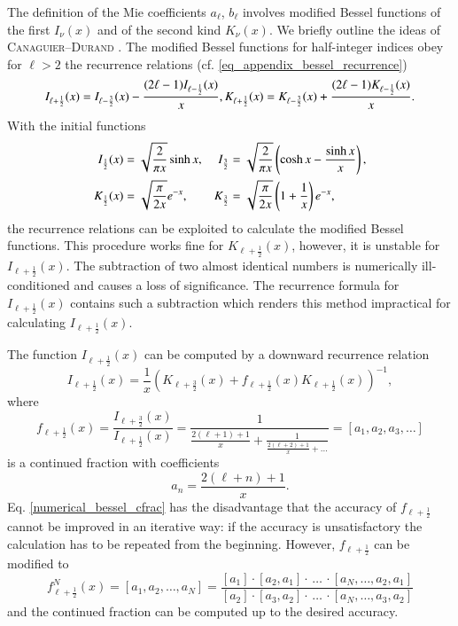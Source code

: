 The definition of the Mie coefficients $a_\ell$, $b_\ell$ involves modified
Bessel functions of the first $I_\nu(x)$ and of the second kind $K_\nu(x)$.  We
briefly outline the ideas of \textsc{Canaguier--Durand} \cite{Durand}.  The
modified Bessel functions for half-integer indices obey for $\ell > 2$ the
recurrence relations (cf. \eqref{eq_appendix_bessel_recurrence})
\begin{equation}
\label{numerics_bessel_recurrence}
I_{\ell+\frac{1}{2}}(x) = I_{\ell-\frac{3}{2}}(x) - \frac{(2\ell-1)I_{\ell-\frac{1}{2}}(x)}{x}, \\
K_{\ell+\frac{1}{2}}(x) = K_{\ell-\frac{3}{2}}(x) + \frac{(2\ell-1)K_{\ell-\frac{1}{2}}(x)}{x}.
\end{equation}
With the initial functions
\begin{align}
\label{numerics_bessel_start}
I_{\frac{1}{2}}(x) &= \sqrt{\frac{2}{\pi x}} \sinh x,   & I_{\frac{3}{2}} &= \sqrt{\frac{2}{\pi x}}\left(\cosh x - \frac{\sinh x}{x}\right), \\
K_{\frac{1}{2}}(x) &= \sqrt{\frac{\pi}{2 x}} e^{-x},   & K_{\frac{3}{2}} &= \sqrt{\frac{\pi}{2x}} \left(1 + \frac{1}{x}\right) e^{-x},
\end{align}
the recurrence relations can be exploited to calculate the modified Bessel
functions. This procedure works fine for $K_{\ell+\frac{1}{2}}(x)$, however, it
is unstable for $I_{\ell+\frac{1}{2}}(x)$. The subtraction of two almost
identical numbers is numerically ill-conditioned and causes a loss of
significance. The recurrence formula for $I_{\ell+\frac{1}{2}}(x)$ contains
such a subtraction which renders this method impractical for calculating
$I_{\ell+\frac{1}{2}}(x)$.

The function $I_{\ell+\frac{1}{2}}(x)$ can be computed by a downward recurrence
relation
\begin{equation}
\label{numerical_bessel_cfrac}
I_{\ell+\frac{1}{2}}(x) = \frac{1}{x} \left(K_{\ell+\frac{3}{2}}(x) + f_{\ell+\frac{1}{2}}(x) K_{\ell+\frac{1}{2}}(x)\right)^{-1},
\end{equation}
where
\begin{equation}
f_{\ell+\frac{1}{2}}(x) = \frac{I_{\ell+\frac{3}{2}}(x)}{I_{\ell+\frac{1}{2}}(x)} = \frac{1}{\frac{2(\ell+1)+1}{x} + \frac{1}{\frac{2(\ell+2)+1}{x} + \dots}} = [a_1, a_2, a_3, \dots]
\end{equation}
is a continued fraction with coefficients
\begin{equation}
a_n = \frac{2(\ell+n)+1}{x}.
\end{equation}
Eq. \eqref{numerical_bessel_cfrac} has the disadvantage that the accuracy of
$f_{\ell+\frac{1}{2}}$ cannot be improved in an iterative way: if the accuracy
is unsatisfactory the calculation has to be repeated from the beginning.
However, $f_{\ell+\frac{1}{2}}$ can be modified to
\begin{equation}
\label{eq:numerics_bessel_cfrac}
f^N_{\ell+\frac{1}{2}}(x) = [a_1, a_2, \dots, a_N] = \frac{[a_1] \cdot [a_2,a_1] \cdot \, \dots \, \cdot [a_N,\dots,a_2,a_1]}{[a_2] \cdot [a_3,a_2] \cdot \, \dots \, \cdot [a_N, \dots, a_3, a_2]}
\end{equation}
and the continued fraction can be computed up to the desired accuracy.

